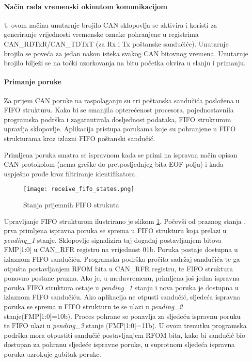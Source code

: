\paragraph{Način rada vremenski okinutom komunikacijom}

U ovom načinu unutarnje brojilo CAN sklopovlja se aktivira i koristi za generiranje vrijednosti vremenske oznake pohranjene u registrima CAN\_RDTxR/CAN\_TDTxT (za Rx i Tx poštanske sandučiće). Unutarnje brojilo se poveća za jedan nakon isteka svakog CAN bitovnog vremena. Unutarnje brojilo bilježi se na točki uzorkovanja na bitu početka okvira u slanju i primanju.

\paragraph{Primanje poruke}

Za prijem CAN poruke na raspolaganju su tri poštanska sandučića posložena u FIFO strukturu. Kako bi se smanjila opterećenost procesora, pojednostavnila programska podrška i zagarantirala dosljednost podataka, FIFO strukturom upravlja sklopovlje. Aplikacija pristupa porukama koje su pohranjene u FIFO strukturama kroz izlazni FIFO poštanski sandučić.

Primljena poruka smatra se ispravnom kada se primi na ispravan način opisan CAN protokolom (nema greške do pretposljednjeg bita EOF polja) i kada uspješno prođe kroz filtriranje identifikatora.

\begin{figure}[H]
	\centering
	\texttt{[image: receive\_fifo\_states.png]}
	\caption{Stanja prijemnih FIFO strukuta \cite{l471_manual}}
	\label{fig:receive_fifo_states}
\end{figure}
Upravljanje FIFO strukturom ilustrirano je slikom \ref{fig:receive_fifo_states}. Počevši od praznog stanja , prva primljena ispravna poruka se sprema u FIFO strukturu koja prelazi u \textit{pending\_1} stanje. Sklopovlje signalizira taj događaj postavljanjem bitova FMP[1:0] u CAN\_RFR registru na vrijednost 01b. Poruka postaje dostupna u izlaznom FIFO sandučiću. Programska podrška pročita sadržaj sandučića te ga otpušta postavljanjem RFOM bita u CAN\_RFR registru, te FIFO struktura ponovno postane prazna. Ako je, u međuvremenu, primljena još jedna ispravna poruka FIFO struktura ostaje u \textit{pending\_1} stanju i nova poruka je dostupna u izlaznom FIFO sandučiću. Ako aplikacija ne otpusti sandučić, sljedeća ispravna poruka se sprema u FIFO strukturu te se ulazi u \textit{pending\_2} stanje(FMP[1:0]=10b). Proces pohrane se ponavlja za sljedeću ispravnu poruku te FIFO ulazi u \textit{pending\_3} stanje (FMP[1:0]=11b). U ovom trenutku programska podrška mora otpustiti sandučić postavljanjem RFOM bita, kako bi sandučić bio dostupan za pohranu sljedeće ispravne poruke, u suprotnom sljedeća ispravna poruka uzrokuje gubitak poruke.

